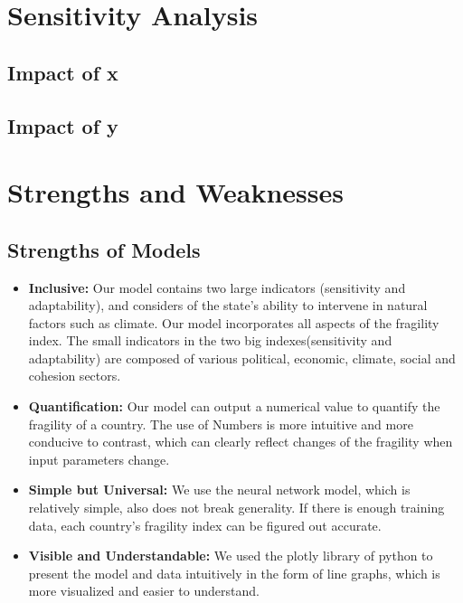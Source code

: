 \documentclass{mcmthesis}
\begin{document}
\section{Sensitivity Analysis}
\subsection{Impact of x}
\subsection{Impact of y}

\section{Strengths and Weaknesses}
\subsection{Strengths of Models}
\begin{itemize}
  \item \textbf{Inclusive:} Our model contains two large indicators (sensitivity and adaptability), and 
  considers of the state's ability to intervene in natural factors such as climate. 
  Our model incorporates all aspects of the fragility index. The small indicators 
  in the two big indexes(sensitivity and adaptability) are composed of various political, 
  economic, climate, social and cohesion sectors.
  \item \textbf{Quantification:} Our model can output a numerical value to quantify the fragility of a country. 
  The use of Numbers is more intuitive and more conducive to contrast, which can clearly 
  reflect changes of the fragility when input parameters change.
  \item \textbf{Simple but Universal:} We use the neural network model, which is relatively simple, also does not break 
  generality. If there is enough training data, each country's fragility index 
  can be figured out  accurate.
  \item \textbf{Visible and Understandable:} We used the plotly library of python to present the model and data 
  intuitively in the form of line graphs, which is more visualized and 
  easier to understand.
\end{itemize}
\end{document}
